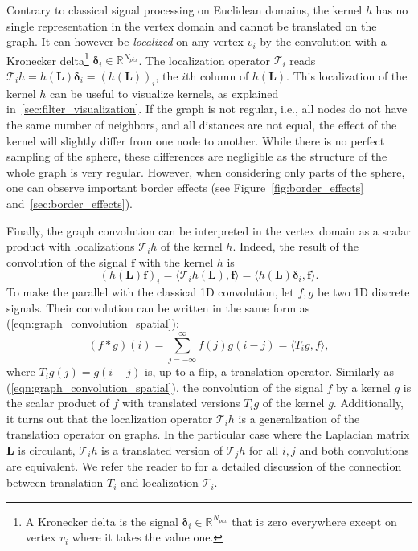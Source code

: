 \documentclass[final,twocolumn,3p,times,authoryear]{elsarticle}
\newcommand{\figref}[1]{Figure~\ref{fig:#1}}
\newcommand{\eqnref}[1]{(\ref{eqn:#1})}
\renewcommand{\b}[1]{{\bm{#1}}}   %
\newcommand{\1}{\b{1}}              %
\newcommand{\0}{\b{0}}              %
\renewcommand{\L}{\b{L}}
\newcommand{\f}{\b{f}}
\newcommand{\R}{\mathbb{R}}
\newcommand{\T}{\mathcal{T}}
\begin{document}
Contrary to classical signal processing on Euclidean domains, the kernel $h$ has no single representation in the vertex domain and cannot be translated on the graph. It can however be \textit{localized} on any vertex $v_i$ by the convolution with a Kronecker delta\footnote{A Kronecker delta is the signal $\b \delta_i \in \R^{N_{pix}}$ that is zero everywhere except on vertex $v_i$ where it takes the value one.} $\b \delta_i \in \R^{N_{pix}}$. The localization operator $\T_i$ reads $\T_i h = h(\L) \b \delta_i = (h(\L))_i$, the $i$th column of $h(\L)$.
This localization of the kernel $h$ can be useful to visualize kernels, as explained in~\ref{sec:filter_visualization}.
If the graph is not regular, i.e., all nodes do not have the same number of neighbors, and all distances are not equal, the effect of the kernel will slightly differ from one node to another. While there is no perfect sampling of the sphere, these differences are negligible as the structure of the whole graph is very regular. However, when considering only parts of the sphere, one can observe important border effects (see \figref{border_effects} and~\ref{sec:border_effects}).

Finally, the graph convolution can be interpreted in the vertex domain as a scalar product with localizations $\T_i h$ of the kernel $h$. Indeed, the result of the convolution of the signal $\f$ with the kernel $h$ is
\begin{equation} \label{eqn:graph_convolution_spatial}
	(h(\L) \f)_i = \langle \T_i h(\L), \f \rangle = \langle h(\L) \b \delta_i, \f \rangle.
\end{equation}
To make the parallel with the classical 1D convolution, let $f, g$ be two 1D discrete signals. Their convolution can be written in the same form as \eqnref{graph_convolution_spatial}:
\begin{equation*}
	(f \ast g) (i) = \sum_{j=-\infty}^\infty f(j) g(i-j) = \langle T_i g,  f \rangle,
\end{equation*}
where $T_i g(j) = g(i-j)$ is, up to a flip, a translation operator. Similarly as \eqnref{graph_convolution_spatial}, the convolution of the signal $f$ by a kernel $g$ is the scalar product of $f$ with translated versions $T_i g$ of the kernel $g$.
Additionally, it turns out that the localization operator $\T_i h$ is a generalization of the translation operator on graphs. In the particular case where the Laplacian matrix $\L$ is circulant, $\T_i h$ is a translated version of $\T_j h$ for all $i, j$ and both convolutions are equivalent. We refer the reader to \citet[Sec 2.2]{perraudin2017stationary} for a detailed discussion of the connection between translation $T_i$ and localization $\T_i$.
\end{document}
